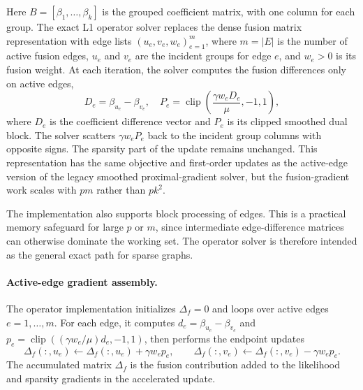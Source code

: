 \documentclass[twoside,11pt]{article}
\DeclareMathOperator{\clip}{clip}
\begin{document}
Here $B=[\beta_1,\ldots,\beta_k]$ is the grouped coefficient matrix, with one
column for each group. 
The exact L1 operator solver replaces the dense fusion matrix representation
with edge lists $(u_e,v_e,w_e)_{e=1}^m$, where $m=|E|$ is the number of
active fusion edges, $u_e$ and $v_e$ are the incident groups for edge $e$, and
$w_e>0$ is its fusion weight. At each iteration, the solver computes the
fusion differences only on active edges,
\[
  D_e = \beta_{u_e}-\beta_{v_e},
  \quad
  P_e = \clip\left(\frac{\gamma w_e D_e}{\mu},-1,1\right),
\]
where $D_e$ is the coefficient difference vector and $P_e$ is its clipped
smoothed dual block. The solver scatters $\gamma w_e P_e$ back to the
incident group columns with opposite signs. The sparsity part of the update
remains unchanged. This representation has the same objective and first-order
updates as the active-edge version of the legacy smoothed proximal-gradient
solver, but the fusion-gradient work scales with $pm$ rather than $pk^2$.

The implementation also supports block processing of edges. This is a practical
memory safeguard for large $p$ or $m$, since intermediate edge-difference
matrices can otherwise dominate the working set. The operator solver is
therefore intended as the general exact path for sparse graphs.

\paragraph{Active-edge gradient assembly.}
The operator implementation initializes $\Delta_f=0$ and loops over active
edges $e=1,\ldots,m$. For each edge, it computes
$d_e=\beta_{u_e}-\beta_{v_e}$ and
$p_e=\clip((\gamma w_e/\mu)d_e,-1,1)$, then performs the endpoint updates
\[
  \Delta_f(:,u_e) \leftarrow \Delta_f(:,u_e)+\gamma w_e p_e,
  \qquad
  \Delta_f(:,v_e) \leftarrow \Delta_f(:,v_e)-\gamma w_e p_e.
\]
The accumulated matrix $\Delta_f$ is the fusion contribution added to the
likelihood and sparsity gradients in the accelerated update.
\end{document}
